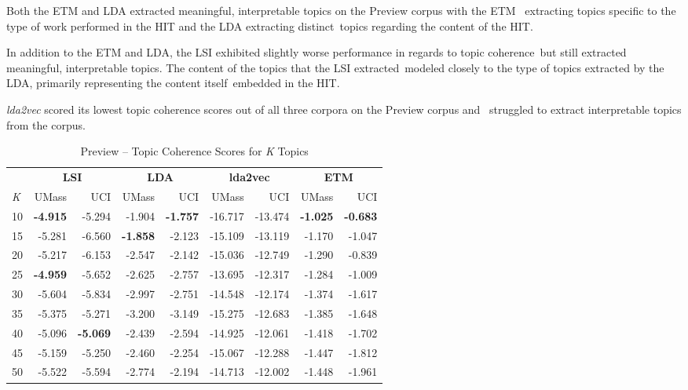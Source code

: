 \documentclass[letterpaper,12pt]{article}
\begin{document}
Both the ETM and LDA extracted meaningful, interpretable topics on the Preview corpus with the ETM \
extracting topics specific to the type of work performed in the HIT and the LDA extracting distinct\
topics regarding the content of the HIT.

In addition to the ETM and LDA, the LSI exhibited slightly worse performance in regards to topic coherence\
but still extracted meaningful, interpretable topics. The content of the topics that the LSI extracted\
modeled closely to the type of topics extracted by the LDA, primarily representing the content itself\
embedded in the HIT.

\emph{lda2vec} scored its lowest topic coherence scores out of all three corpora on the Preview corpus and \
struggled to extract interpretable topics from the corpus.
\begin{table}
	\caption{\label{tab:preview_tc} Preview -- Topic Coherence Scores for \emph{K} Topics}
	\begin{center}
		\begin{tabular}{| l |rr|rr|rr|rr|}
			\hline
			{} & \multicolumn{2}{c|}{\textbf{LSI}} & \multicolumn{2}{c|}{\textbf{LDA}} & \multicolumn{2}{c|}{\textbf{lda2vec}} & \multicolumn{2}{c|}{\textbf{ETM}} \\
			\emph{K} &  UMass &    UCI &  UMass &    UCI &   UMass &     UCI &  UMass &    UCI \\
			\hline
			10  & \textbf{-4.915} & -5.294 & -1.904 & \textbf{-1.757} & -16.717 & -13.474 & \textbf{-1.025} & \textbf{-0.683} \\
			15  & -5.281 & -6.560 & \textbf{-1.858} & -2.123 & -15.109 & -13.119 & -1.170 & -1.047 \\
			20  & -5.217 & -6.153 & -2.547 & -2.142 & -15.036 & -12.749 & -1.290 & -0.839 \\
			25  & \textbf{-4.959} & -5.652 & -2.625 & -2.757 & -13.695 & -12.317 & -1.284 & -1.009 \\
			30  & -5.604 & -5.834 & -2.997 & -2.751 & -14.548 & -12.174 & -1.374 & -1.617 \\
			35  & -5.375 & -5.271 & -3.200 & -3.149 & -15.275 & -12.683 & -1.385 & -1.648 \\
			40  & -5.096 & \textbf{-5.069} & -2.439 & -2.594 & -14.925 & -12.061 & -1.418 & -1.702 \\
			45  & -5.159 & -5.250 & -2.460 & -2.254 & -15.067 & -12.288 & -1.447 & -1.812 \\
			50  & -5.522 & -5.594 & -2.774 & -2.194 & -14.713 & -12.002 & -1.448 & -1.961 \\

\end{tabular}
\end{center}
\end{table}
\end{document}
